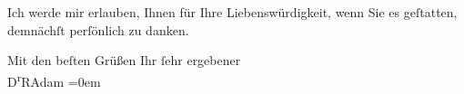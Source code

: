 \pstart
           Ich werde mir erlauben, Ihnen für Ihre Liebenswürdigkeit, wenn Sie es geſtatten,
               demnächſt perſönlich zu danken.\pend
           
\pstart
           Mit den beſten Grüßen Ihr ſehr ergebener{\\[\baselineskip]}\spacefill\mbox{D\textsuperscript{r}RAdam}\pend
           \leftskip=0em{}\endnumbering{}  
      